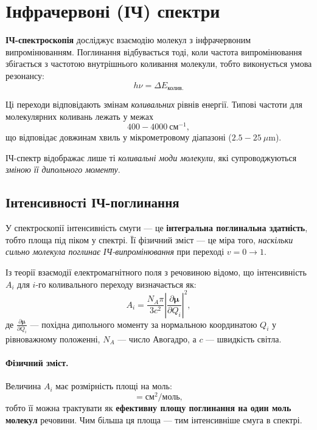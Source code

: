 \section{Інфрачервоні (ІЧ) спектри}

\textbf{ІЧ-спектроскопія} досліджує взаємодію молекул з інфрачервоним випромінюванням.
Поглинання відбувається тоді, коли частота випромінювання збігається з частотою
внутрішнього коливання молекули, тобто виконується умова резонансу:
\begin{equation*}
    h\nu = \Delta E_{\text{колив.}}
\end{equation*}

Ці переходи відповідають змінам \emph{коливальних} рівнів енергії.
Типові частоти для молекулярних коливань лежать у межах
\begin{equation*}
    400 - 4000~\text{см}^{-1},
\end{equation*}
що відповідає довжинам хвиль у мікрометровому діапазоні ($2.5 - 25~\mu$m).

ІЧ-спектр відображає лише ті \textit{коливальні моди молекули}, які супроводжуються \emph{зміною її дипольного моменту}.

\subsection{Інтенсивності ІЧ-поглинання}

У спектроскопії інтенсивність смуги --- це \textbf{інтегральна поглинальна здатність}, тобто
площа під піком у спектрі.
Її фізичний зміст --- це міра того, \emph{наскільки сильно молекула поглинає ІЧ-випромінювання}
при переході $v=0 \to 1$.

Із теорії взаємодії електромагнітного поля з речовиною відомо, що інтенсивність $A_i$ для $i$-го коливального переходу визначається як:
\begin{equation*}
    A_i = \frac{N_A \pi}{3 c^2}
    \left| \frac{\partial \boldsymbol{\mu}}{\partial Q_i} \right|^2,
\end{equation*}
де $\tfrac{\partial \boldsymbol{\mu}}{\partial Q_i}$ --- похідна дипольного моменту за нормальною координатою
$Q_i$ у рівноважному положенні, $N_A$ --- число Авогадро, а $c$ --- швидкість світла.

\paragraph{Фізичний зміст.}
Величина $A_i$ має розмірність площі на моль:
\begin{equation*}
    [A_i] = \text{см}^2 \text{/моль},
\end{equation*}
тобто її можна трактувати як \textbf{ефективну площу поглинання на один моль молекул} речовини.
Чим більша ця площа --- тим інтенсивніше смуга в спектрі.


